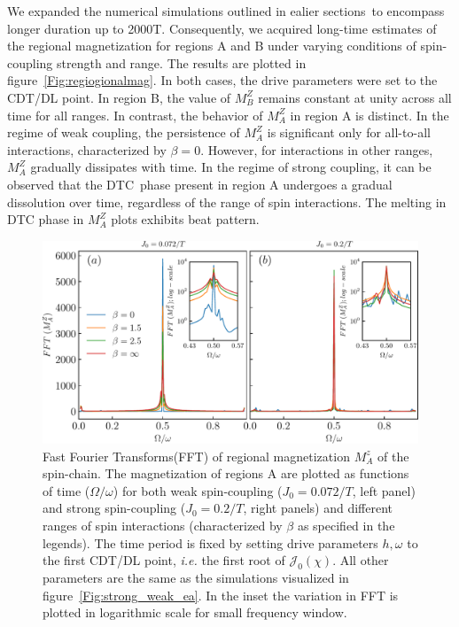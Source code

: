 \documentclass[12pt]{iopart}
\begin{document}
We expanded the numerical simulations outlined in ealier sections to encompass longer duration up to 2000T. Consequently, we acquired long-time estimates of the regional magnetization for regions A and B under varying conditions of spin-coupling strength and range. The results are plotted in figure~\ref{Fig:regiogionalmag}. In both cases, the drive parameters were set to the CDT/DL point. In region B, the value of $M^Z_B$ remains constant at unity across all time for all ranges. In contrast, the behavior of $M^Z_A$ in region A is distinct. In the regime of weak coupling, the persistence of $M^Z_A$ is significant only for all-to-all interactions, characterized by $\beta=0$. However, for interactions in other ranges, $M^Z_A$ gradually dissipates with time. In the regime of strong coupling, it can be observed that the DTC phase present in region A undergoes a gradual dissolution over time, regardless of the range of spin interactions. The melting in DTC phase in $M^Z_A$ plots exhibits beat pattern.
\begin{figure}[t]
	\centering
	\hspace{1.5cm}\includegraphics[width = 13cm]{figure10.pdf}
	\caption{
		Fast Fourier Transforms(FFT) of regional magnetization $M^z_{A}$ of the spin-chain. The magnetization of regions A are plotted as functions of time ($\Omega/\omega$) for both weak spin-coupling ($J_0=0.072/T$, left panel) and strong spin-coupling ($J_0=0.2/T$, right panels) and different ranges of spin interactions (characterized by $\beta$ as specified in the legends). The time period is fixed by setting drive parameters $h,\omega$ to the first CDT/DL point, \textit{i.e.} the first root of $\mathcal{J}_0(\chi)$. All other parameters are the same as the simulations visualized in figure~\ref{Fig:strong_weak_ea}. In the inset the variation in FFT is plotted in logarithmic scale for small frequency window.}
	\label{Fig:regionalFFT}
\end{figure}
\end{document}
